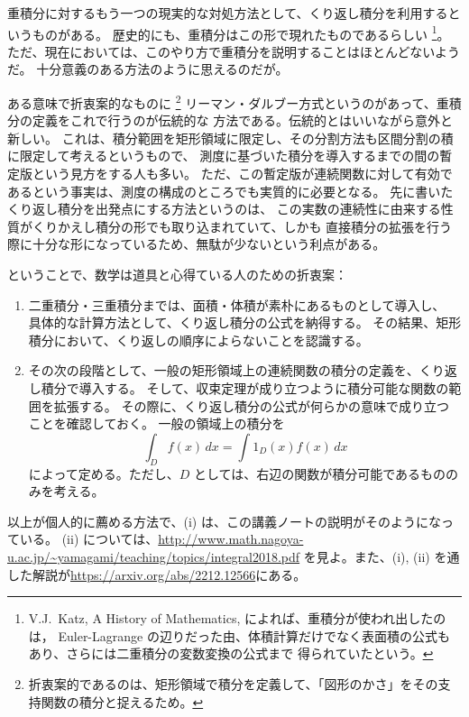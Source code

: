 \documentclass[a4paper]{jsarticle}
\theoremstyle{definition}
\theoremstyle{remark}
\begin{document}
重積分に対するもう一つの現実的な対処方法として、くり返し積分を利用するというものがある。
歴史的にも、重積分はこの形で現れたものであるらしい
\footnote{V.J.~Katz, A History of Mathematics, によれば、重積分が使われ出したのは，
Euler-Lagrange の辺りだった由、体積計算だけでなく表面積の公式もあり、さらには二重積分の変数変換の公式まで
得られていたという。%
}。
ただ、現在においては、このやり方で重積分を説明することはほとんどないようだ。
十分意義のある方法のように思えるのだが。

ある意味で折衷案的なものに
\footnote{
折衷案的であるのは、矩形領域で積分を定義して、「図形のかさ」をその支持関数の積分と捉えるため。
}
リーマン・ダルブー方式というのがあって、重積分の定義をこれで行うのが伝統的な
方法である。伝統的とはいいながら意外と新しい。
これは、積分範囲を矩形領域に限定し、その分割方法も区間分割の積に限定して考えるというもので、
測度に基づいた積分を導入するまでの間の暫定版という見方をする人も多い。
ただ、この暫定版が連続関数に対して有効であるという事実は、測度の構成のところでも実質的に必要となる。
先に書いたくり返し積分を出発点にする方法というのは、
この実数の連続性に由来する性質がくりかえし積分の形でも取り込まれていて、しかも
直接積分の拡張を行う際に十分な形になっているため、無駄が少ないという利点がある。

ということで、数学は道具と心得ている人のための折衷案：
\begin{enumerate}
\item
二重積分・三重積分までは、面積・体積が素朴にあるものとして導入し、
具体的な計算方法として、くり返し積分の公式を納得する。
その結果、矩形積分において、くり返しの順序によらないことを認識する。
\item
その次の段階として、一般の矩形領域上の連続関数の積分の定義を、くり返し積分で導入する。
そして、収束定理が成り立つように積分可能な関数の範囲を拡張する。
その際に、くり返し積分の公式が何らかの意味で成り立つことを確認しておく。
一般の領域上の積分を
\[
\int_D f(x)\, dx = \int 1_D(x)f(x)\, dx
\]
によって定める。ただし、$D$ としては、右辺の関数が積分可能であるもののみを考える。
\end{enumerate}

以上が個人的に薦める方法で、(i) は、この講義ノートの説明がそのようになっている。
(ii) については、\url{http://www.math.nagoya-u.ac.jp/~yamagami/teaching/topics/integral2018.pdf}
を見よ。また、(i), (ii) を通した解説が\url{https://arxiv.org/abs/2212.12566}にある。
\end{document}
